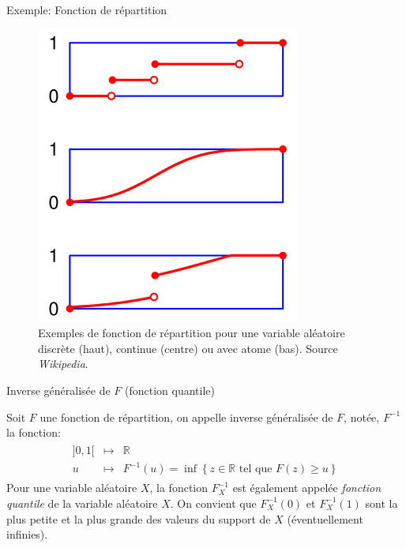 \documentclass[ignorenonframetext,]{beamer}
\newcommand{\R}{\mathbb{R}}
\begin{document}
\begin{frame}{Exemple: Fonction de répartition}
\protect\hypertarget{exemple-fonction-de-ruxe9partition}{}

\begin{figure}
\centering
\includegraphics[height = 0.7\textheight]{figures/fonction_repartition}
\caption{\label{fig:fonc:rep} Exemples de fonction de répartition pour une variable aléatoire discrète (haut), continue (centre) ou avec atome (bas). Source \textit{Wikipedia}.}
\end{figure}

\end{frame}

\begin{frame}{Inverse généralisée de \(F\) (fonction quantile)}
\protect\hypertarget{inverse-guxe9nuxe9ralisuxe9e-de-f-fonction-quantile}{}

Soit \(F\) une fonction de répartition, on appelle inverse généralisée
de \(F\), notée, \(F^{-1}\) la fonction: \begin{align*}
\begin{array}{ccl}
]0, 1[&\mapsto& \R\\
u &\mapsto& F^{-1}(u) = \inf\left\lbrace z \in \R \text{ tel que } F(z) \geq u \right\rbrace
\end{array}
\end{align*} Pour une variable aléatoire \(X\), la fonction \(F_X^{-1}\)
est également appelée \emph{fonction quantile} de la variable aléatoire
\(X\). On convient que \(F_X^{-1}(0)\) et \(F_X^{-1}(1)\) sont la plus
petite et la plus grande des valeurs du support de \(X\) (éventuellement
infinies).

\end{frame}
\end{document}
